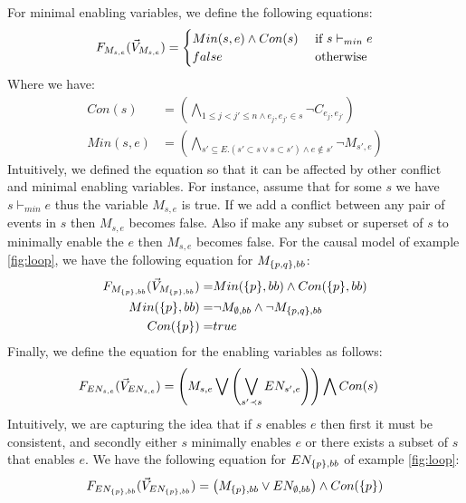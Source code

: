 \noindent
For minimal enabling variables, we define the following equations:
$$
    F_{M_{s,e}}(\vec V_{M_{s,e}}) = \begin{cases}
        Min(s,e) \wedge Con(s) & \text{ if } s \vdash_{min} e \\
        false                  & \text{ otherwise }
    \end{cases}
$$
Where we have:
\begin{align*}
    Con(s)   & =   \left(
    \bigwedge_{ 1\leq j<j' \leq n \wedge e_j,e_{j'} \in s}
    \neg C_{e_j,e_{j'}}
    \right)               \\
    Min(s,e) & = \left(
    \bigwedge_{s' \subseteq E. (s' \subset s \vee s \subset s')
        \wedge e \notin s'}
    \neg M_{s',e}
    \right)
\end{align*}
Intuitively, we defined the equation so that it can be affected by 
other conflict and minimal enabling variables.
For instance, assume that for some $s$ we have $s \vdash_{min} e$
thus the variable $M_{s,e}$ is true.
If we add a conflict between any pair of events in $s$ then $M_{s,e}$
becomes false.
Also if make any subset or superset of $s$ to minimally enable the $e$ then
$M_{s,e}$ becomes false.
For the causal model of example \ref{fig:loop}, we have the following 
equation for $M_{\{p,q\},bb}$:
\begin{align*}
    F_{M_{\{p\},bb}}(\vec V_{M_{\{p\},bb}}) = & Min(\{p\},bb) \wedge Con(\{p\},bb) \\
    Min(\{p\},bb) = & \neg M_{\emptyset,bb} \wedge \neg M_{\{p,q\},bb} \\
    Con(\{p\}) = & true 
\end{align*}
Finally, we define the equation for the enabling variables as follows:
\begin{align*}
    F_{EN_{s,e}}(\vec V_{EN_{s,e}}) & =
    \left(
    M_{s,e} \bigvee
    \left(
    \bigvee_{s'\prec s}EN_{s',e}
    \right)
    \right)
    \bigwedge
    Con(s)
\end{align*}
Intuitively, we are capturing the idea that if $s$ enables $e$ then first 
it must be consistent, and secondly either $s$ minimally enables $e$ or 
there exists a subset of $s$ that enables $e$.
We have the following equation for $EN_{\{p\},bb}$ of example \ref{fig:loop}:
\begin{align*}
    F_{EN_{\{p\},bb}}(\vec V_{EN_{\{p\},bb}}) = 
    \left(
        M_{\{p\},bb} \vee EN_{\emptyset,bb}
    \right) \wedge Con(\{p\})
\end{align*}


